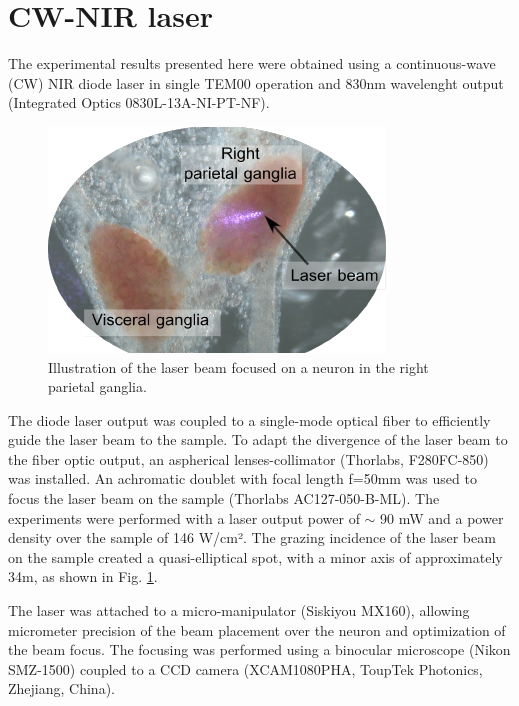 \section{CW-NIR laser}
The experimental results presented here were obtained using a continuous-wave (CW) NIR diode laser in single TEM00 operation and 830nm wavelenght output (Integrated Optics 0830L-13A-NI-PT-NF). \begin{figure}
    \centering
	\includegraphics{img/laser/laser-beam.pdf}
	\caption{Illustration of the laser beam focused on a neuron in the right parietal ganglia.}
	\label{fig:laser beam}
\end{figure} 
The diode laser output was coupled to a single-mode optical fiber to efficiently guide the laser beam to the sample. To adapt the divergence of the laser beam to the fiber optic output, an aspherical lenses-collimator (Thorlabs, F280FC-850) was installed. An achromatic doublet with focal length f=50mm was used to focus the laser beam on the sample (Thorlabs AC127-050-B-ML). The experiments were performed with a laser output power of $\sim$ 90 mW and a power density over the sample of 146 W/cm². The grazing incidence of the laser beam on the sample created a quasi-elliptical spot, with a minor axis of approximately 34{\textmu}m, as shown in Fig. \ref{fig:laser beam}.



The laser was attached to a micro-manipulator (Siskiyou MX160), allowing micrometer precision of the beam placement over the neuron and optimization of the beam focus. The focusing was performed using a binocular microscope (Nikon SMZ-1500) coupled to a CCD camera (XCAM1080PHA, ToupTek Photonics, Zhejiang, China).


